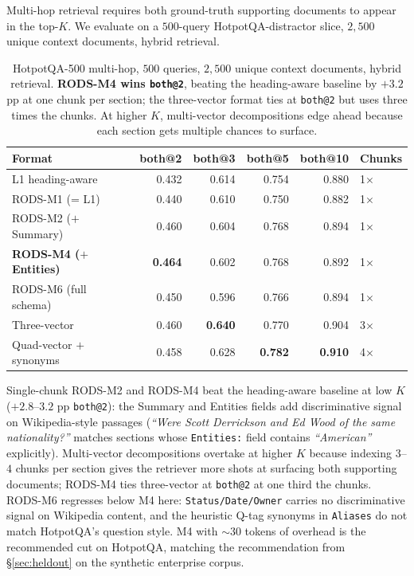 \documentclass[11pt]{article}
\begin{document}
Multi-hop retrieval requires both ground-truth supporting documents
to appear in the top-$K$. We evaluate on a $500$-query
HotpotQA-distractor slice, $2{,}500$ unique context documents,
hybrid retrieval.

\begin{table}[t]
\centering
\caption{HotpotQA-500 multi-hop, $500$ queries, $2{,}500$ unique
  context documents, hybrid retrieval. \textbf{RODS-M4 wins
  \texttt{both@2}}, beating the heading-aware baseline by $+3.2$ pp
  at one chunk per section; the three-vector format ties at
  \texttt{both@2} but uses three times the chunks. At higher $K$,
  multi-vector decompositions edge ahead because each section gets
  multiple chances to surface.}
\label{tab:hotpot}
\begin{tabular}{lrrrrl}
\toprule
\textbf{Format} & \textbf{both@2} & \textbf{both@3} & \textbf{both@5} & \textbf{both@10} & \textbf{Chunks} \\
\midrule
L1 heading-aware             & 0.432 & 0.614 & 0.754 & 0.880 & 1$\times$ \\
RODS-M1 (= L1)               & 0.440 & 0.610 & 0.750 & 0.882 & 1$\times$ \\
RODS-M2 ($+$ Summary)        & 0.460 & 0.604 & 0.768 & 0.894 & 1$\times$ \\
\rowcolor{bestcolor!12}
\textbf{RODS-M4 ($+$ Entities)} & \textbf{0.464} & 0.602 & 0.768 & 0.892 & 1$\times$ \\
RODS-M6 (full schema)        & 0.450 & 0.596 & 0.766 & 0.894 & 1$\times$ \\
Three-vector                 & 0.460 & \textbf{0.640} & 0.770 & 0.904 & 3$\times$ \\
Quad-vector $+$ synonyms     & 0.458 & 0.628 & \textbf{0.782} & \textbf{0.910} & 4$\times$ \\
\bottomrule
\end{tabular}
\end{table}

Single-chunk RODS-M2 and RODS-M4 beat the heading-aware baseline at
low $K$ ($+2.8$--$3.2$ pp \texttt{both@2}): the Summary and Entities
fields add discriminative signal on Wikipedia-style passages
(\textit{``Were Scott Derrickson and Ed Wood of the same
nationality?''} matches sections whose \texttt{Entities:} field
contains \textit{``American''} explicitly). Multi-vector decompositions
overtake at higher $K$ because indexing $3$--$4$ chunks per section
gives the retriever more shots at surfacing both supporting
documents; RODS-M4 ties three-vector at \texttt{both@2} at one third
the chunks. RODS-M6 regresses below M4 here: \texttt{Status/Date/Owner}
carries no discriminative signal on Wikipedia content, and the
heuristic Q-tag synonyms in \texttt{Aliases} do not match HotpotQA's
question style. M4 with $\sim 30$ tokens of overhead is the
recommended cut on HotpotQA, matching the recommendation from
\S\ref{sec:heldout} on the synthetic enterprise corpus.
\end{document}
